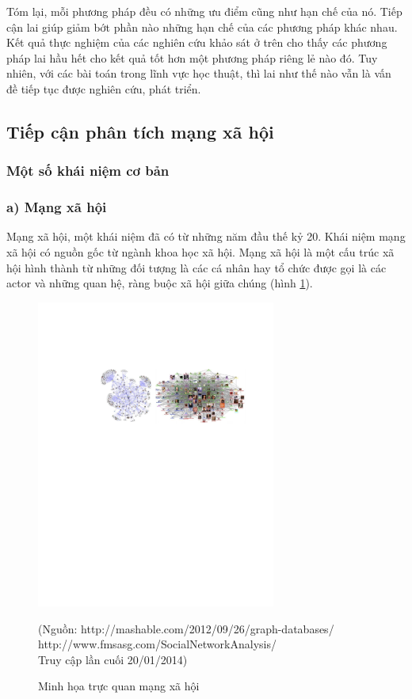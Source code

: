 Tóm lại, mỗi phương pháp đều có những ưu điểm cũng như hạn chế của nó. Tiếp cận lai giúp giảm bớt phần nào những hạn chế của các phương pháp khác nhau. Kết quả thực nghiệm của các nghiên cứu khảo sát ở trên cho thấy các phương pháp lai hầu hết cho kết quả tốt hơn một phương pháp riêng lẻ nào đó. Tuy nhiên, với các bài toán trong lĩnh vực học thuật, thì lai như thế nào vẫn là vấn đề tiếp tục được nghiên cứu, phát triển. 

\subsection{Tiếp cận phân tích mạng xã hội}
\subsubsection{Một số khái niệm cơ bản}
\subsubsection*{a) Mạng xã hội}
Mạng xã hội, một khái niệm đã có từ những năm đầu thế kỷ 20. Khái niệm mạng xã hội có nguồn gốc từ ngành khoa học xã hội. Mạng xã hội là một cấu trúc xã hội hình thành từ những đối tượng là các cá nhân hay tổ chức được gọi là các actor và những quan hệ, ràng buộc xã hội giữa chúng \cite{Wasserman1994} (hình \ref{fig:figure_1_3}).
\begin{figure}[ht]
\begin{center}
  \includegraphics[width=0.7\textwidth]{Figure_1_3.pdf}
  \caption{Minh họa trực quan mạng xã hội}\label{fig:figure_1_3}
  (Nguồn: http://mashable.com/2012/09/26/graph-databases/\\
  http://www.fmsasg.com/SocialNetworkAnalysis/\\
  Truy cập lần cuối 20/01/2014)
\end{center}
\end{figure}

